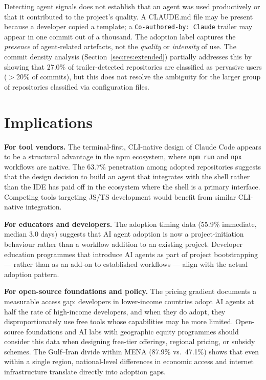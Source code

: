 Detecting agent signals does not establish that an agent was used productively or that it contributed to the project's quality. A CLAUDE.md file may be present because a developer copied a template; a \texttt{Co-authored-by: Claude} trailer may appear in one commit out of a thousand. The adoption label captures the \emph{presence} of agent-related artefacts, not the \emph{quality} or \emph{intensity} of use. The commit density analysis (Section~\ref{sec:res:extended}) partially addresses this by showing that 27.0\% of trailer-detected repositories are classified as pervasive users ($>$20\% of commits), but this does not resolve the ambiguity for the larger group of repositories classified via configuration files.

\section{Implications}
\label{sec:disc:implications}

\textbf{For tool vendors.}
The terminal-first, CLI-native design of Claude Code appears to be a structural advantage in the npm ecosystem, where \texttt{npm run} and \texttt{npx} workflows are native. The 63.7\% penetration among adopted repositories suggests that the design decision to build an agent that integrates with the shell rather than the IDE has paid off in the ecosystem where the shell is a primary interface. Competing tools targeting JS/TS development would benefit from similar CLI-native integration.

\textbf{For educators and developers.}
The adoption timing data (55.9\% immediate, median 3.0 days) suggests that AI agent adoption is now a project-initiation behaviour rather than a workflow addition to an existing project. Developer education programmes that introduce AI agents as part of project bootstrapping --- rather than as an add-on to established workflows --- align with the actual adoption pattern.

\textbf{For open-source foundations and policy.}
The pricing gradient documents a measurable access gap: developers in lower-income countries adopt AI agents at half the rate of high-income developers, and when they do adopt, they disproportionately use free tools whose capabilities may be more limited. Open-source foundations and AI labs with geographic equity programmes should consider this data when designing free-tier offerings, regional pricing, or subsidy schemes. The Gulf--Iran divide within MENA (87.9\% vs.\ 47.1\%) shows that even within a single region, national-level differences in economic access and internet infrastructure translate directly into adoption gaps.
